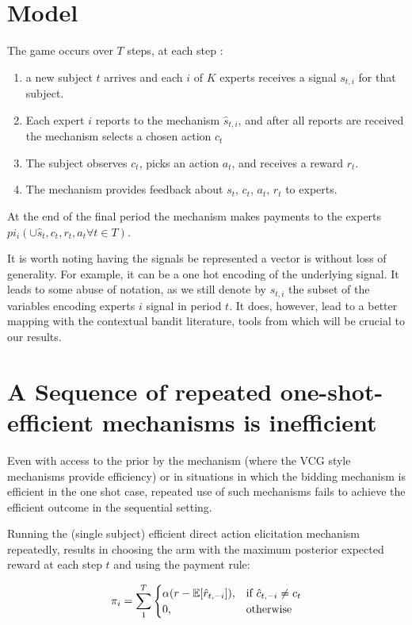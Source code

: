 \section{Model}

The game occurs over $T$ steps, at each step : 

\begin{enumerate}
\item a new subject $t$ arrives and each $i$ of $K$ experts receives a signal $s_{t,i}$ for that subject.
\item Each expert $i$ reports to the mechanism $\hat{s}_{t,i}$, and after all reports are received the mechanism selects a chosen action $c_t$
\item The subject observes $c_t$, picks an action $a_t$, and receives a reward $r_t$.
\item The mechanism provides feedback about $s_t$, $c_t$, $a_t$, $r_t$ to experts.
\end{enumerate}
At the end of the final period the mechanism makes payments to the experts $pi_i( \cup \hat{s}_t,c_t,r_t,a_t \forall t \in T)$.


It is worth noting having the signals be represented a vector is without loss of generality.
For example, it can be a one hot encoding of the underlying signal.
It leads to some abuse of notation, as we still denote by $s_{t,i}$ the subset of the variables encoding experts $i$ signal in period $t$. It does, however, lead to a better mapping with the contextual bandit literature, tools from which will be crucial to our results. 


\section{A Sequence of repeated one-shot-efficient mechanisms is inefficient}


Even with access to the prior by the mechanism (where the VCG style mechanisms provide efficiency) or in situations in which the bidding mechanism is efficient in the one shot case, repeated use of such mechanisms fails to achieve the efficient outcome in the sequential setting. 

Running the (single subject) efficient direct action elicitation mechanism repeatedly, results in choosing the arm with the maximum posterior expected reward at each step $t$ and using the payment rule:

\[
    \pi_i = \sum_1^T 
\begin{cases}
    \alpha (r - \expec[\hat{r}_{t,-i}]) ,& \text{if } \hat{c}_{t,-i} \neq c_t\\
    0,              & \text{otherwise}
\end{cases}
\]

